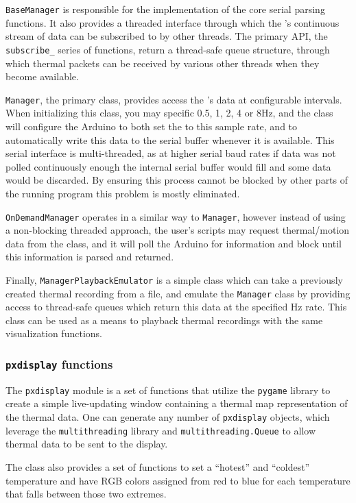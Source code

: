 \documentclass[../thesis/thesis.tex]{subfiles}
\begin{document}
\texttt{BaseManager} is responsible for the implementation of the core serial parsing functions. It also provides a threaded interface through which the \mlx's continuous stream of data can be subscribed to by other threads. The primary API, the \texttt{subscribe\_} series of functions, return a thread-safe queue structure, through which thermal packets can be received by various other threads when they become available.

\texttt{Manager}, the primary class, provides access the \mlx's data at configurable intervals. When initializing this class, you may specific 0.5, 1, 2, 4 or 8Hz, and the class will configure the Arduino to both set the \mlx to this sample rate, and to automatically write this data to the serial buffer whenever it is available. This serial interface is multi-threaded, as at higher serial baud rates if data was not polled continuously enough the internal serial buffer would fill and some data would be discarded. By ensuring this process cannot be blocked by other parts of the running program this problem is mostly eliminated. 

\texttt{OnDemandManager} operates in a similar way to \texttt{Manager}, however instead of using a non-blocking threaded approach, the user's scripts may request thermal/motion data from the class, and it will poll the Arduino for information and block until this information is parsed and returned.

Finally, \texttt{ManagerPlaybackEmulator} is a simple class which can take a previously created thermal recording from a file, and emulate the \texttt{Manager} class by providing access to thread-safe queues which return this data at the specified Hz rate. This class can be used as a means to playback thermal recordings with the same visualization functions.

\subsubsection*{\texttt{pxdisplay} functions}

The \texttt{pxdisplay} module is a set of functions that utilize the \texttt{pygame} library to create a simple live-updating window containing a thermal map representation of the thermal data. One can generate any number of \texttt{pxdisplay} objects, which leverage the \texttt{multithreading} library and \texttt{multithreading.Queue} to allow thermal data to be sent to the display.

The class also provides a set of functions to set a ``hotest'' and ``coldest'' temperature and have RGB colors assigned from red to blue for each temperature that falls between those two extremes.
\end{document}
